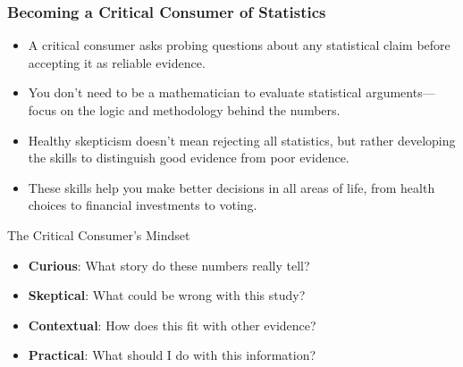 \documentclass{beamer}
\begin{document}
				\begin{frame}
					\frametitle{Becoming a Critical Consumer of Statistics}
					
					\begin{itemize}
						\item A critical consumer asks probing questions about any statistical claim before accepting it as reliable evidence.
						\item You don't need to be a mathematician to evaluate statistical arguments—focus on the logic and methodology behind the numbers.
						\item Healthy skepticism doesn't mean rejecting all statistics, but rather developing the skills to distinguish good evidence from poor evidence.
						\item These skills help you make better decisions in all areas of life, from health choices to financial investments to voting.
					\end{itemize}
					
					\begin{block}{The Critical Consumer's Mindset}
						\begin{itemize}
							\item \textbf{Curious}: What story do these numbers really tell?
							\item \textbf{Skeptical}: What could be wrong with this study?
							\item \textbf{Contextual}: How does this fit with other evidence?
							\item \textbf{Practical}: What should I do with this information?
						\end{itemize}
					\end{block}
					
				\end{frame}
				
\end{document}
